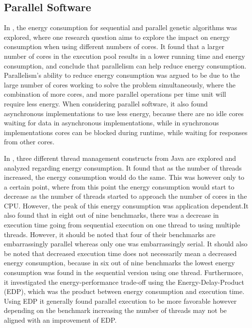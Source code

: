 \subsection{Parallel Software}

In \cite{abdelhafez2019}, the energy consumption for sequential and parallel genetic algorithms was explored, where one research question aims to explore the impact on energy consumption when using different numbers of cores. It found that a larger number of cores in the execution pool results in a lower running time and energy consumption, and conclude that parallelism can help reduce energy consumption. Parallelism's ability to reduce energy consumption was argued to be due to the large number of cores working to solve the problem simultaneously, where the combination of more cores, and more parallel operations per time unit will require less energy. When considering parallel software, it also found asynchronous implementations to use less energy, because there are no idle cores waiting for data in asynchronous implementations, while in synchronous implementations cores can be blocked during runtime, while waiting for responses from other cores. 


In \cite{Pinto2014}, three different thread management constructs from Java are explored and analyzed regarding energy consumption. It found that as the number of threads increased, the energy consumption would do the same. This was however only to a certain point, where from this point the energy consumption would start to decrease as the number of threads started to approach the number of cores in the CPU. However, the peak of this energy consumption was application dependent.It also found that in eight out of nine benchmarks, there was a decrease in execution time going from sequential execution on one thread to using multiple threads. However, it should be noted that four of their benchmarks are embarrassingly parallel whereas only one was embarrassingly serial. It should also be noted that decreased execution time does not necessarily mean a decreased energy consumption, because in six out of nine benchmarks the lowest energy consumption was found in the sequential version using one thread. Furthermore, it investigated the energy-performance trade-off using the Energy-Delay-Product (EDP), which was the product between energy consumption and execution time. Using EDP it generally found parallel execution to be more favorable however depending on the benchmark increasing the number of threads may not be aligned with an improvement of EDP.\cite{Pinto2014}



